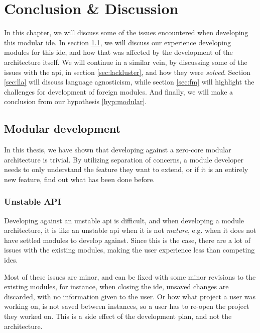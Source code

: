 \chapter{Conclusion \& Discussion} \label{cha:conclusion}

In this chapter, we will discuss some of the issues encountered when developing
this modular \gls*{ide}. In section \ref{sec:mod-dev}, we will discuss our
experience developing modules for this \gls*{ide}, and how that was affected by
the development of the architecture itself. We will continue in a similar vein,
by discussing some of the issues with the \gls*{api}, in section
\ref{sec:lackluster}, and how they were \textit{solved}. Section \ref{sec:lla}
will discuss language agnosticism, while section \ref{sec:fm} will highlight the
challenges for development of foreign modules. And finally, we will make a
conclusion from our hypothesis \ref{hyp:modular}.


\section{Modular development} \label{sec:mod-dev}

In this thesis, we have shown that developing against a zero-core modular
architecture is trivial. By utilizing separation of concerns, a module developer
needs to only understand the feature they want to extend, or if it is an
entirely new feature, find out what has been done before.


\subsection{Unstable API}

Developing against an unstable \gls*{api} is difficult, and when developing a
module architecture, it is like an unstable \gls*{api} when it is not
\textit{mature}, e.g. when it does not have settled modules to develop against.
Since this is the case, there are a lot of issues with the existing modules,
making the user experience less than competing \gls*{ide}s.

Most of these issues are minor, and can be fixed with some minor revisions to
the existing modules, for instance, when closing the \gls*{ide}, unsaved changes
are discarded, with no information given to the user. Or how what project a user
was working on, is not saved between instances, so a user has to re-open the
project they worked on. This is a side effect of the development plan, and not
the architecture.

